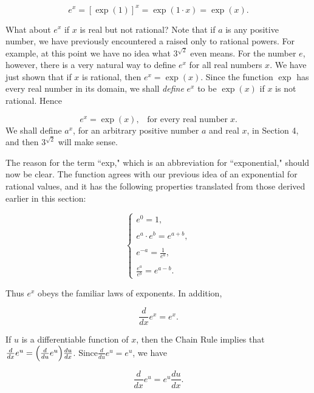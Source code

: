 $$
e^{x} = [\exp (1)]^{x} = \exp (1 \cdot x) = \exp(x).
$$

\noindent What about $e^{x}$ if $x$ is real but not rational? Note that if $a$ is any positive number, we have previously encountered a raised only to rational powers. For example, at this point we have no idea what $3^{\sqrt 2}$ even means. For the number $e$, however, there is a very natural way to define $e^{x}$ for all real numbers $x$. We have just shown that if $x$ is rational, then $e^{x} = \exp (x)$.
Since the function $\exp$ has every real number in its domain, we shall \textit{define} $e^{x}$ to be $\exp (x)$ if $x$ is not rational. Hence

$$
e^{x} = \exp(x), \;\;\;\mbox{for every real number}\; x.  
$$
\noindent We shall define $a^{x}$, for an arbitrary positive number $a$ and real $x$, in Section 4, and then $3^{\sqrt 2}$ will make sense.

The reason for the term ``exp," which is an abbreviation for ``exponential," should now be clear. The function agrees with our previous idea of an exponential for rational values, and it has the following properties translated from those derived earlier in this section:

\begin{equation}
\left \{
\begin{array}{c}
e^{0} = 1,\\
\\
e^{a} \cdot e^{b} = e^{a + b},\\
\\
e^{-a} = \frac{1}{e^a},\\
\\
\frac{e^a}{e^b} = e^{a-b}.
\end{array}
\right.
\label{eq5.2.1}
\end{equation}

\noindent Thus $e^{x}$ obeys the familiar laws of exponents. In addition,

\begin{equation}
\frac{d}{dx} e^{x} = e^{x}.
\label{eq5.2.2}
\end{equation}

If $u$ is a differentiable function of $x$, then the Chain Rule implies that
$\frac{d}{dx} e^u = \Bigl( \frac{d}{du} e^{u} \Bigr) \frac{du}{dx}$. Since$ \frac{d}{du} e^u = e^u$, we have 

\begin{equation}
\frac{d}{dx} e^u = e^u \frac{du}{dx}.
\label{eq5.2.3}
\end{equation} 

